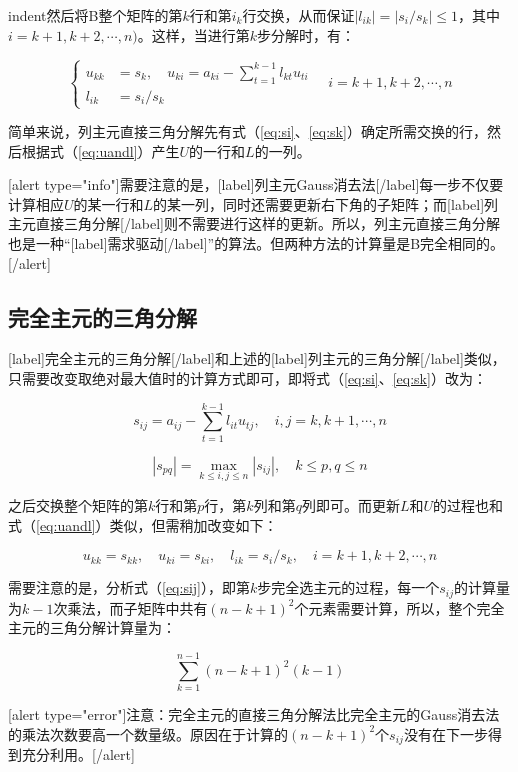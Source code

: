 \documentclass[UTF8,nofonts]{ctexart}
\begin{document}
indent然后将B整个矩阵的第$k$行和第$i_k$行交换，从而保证$|l_{ik}|=|s_i/s_k|\leq 1$，其中$i=k+1,k+2,\cdots,n)$。这样，当进行第$k$步分解时，有：

\begin{equation}
\label{eq:uandl}
\begin{cases}
u_{kk} &= s_{k},\quad u_{ki} = a_{ki}-\sum_{t=1}^{k-1}l_{kt}u_{ti} \\
l_{ik} &= s_i/s_k
\end{cases}
\quad i=k+1,k+2,\cdots,n
\end{equation}

简单来说，列主元直接三角分解先有式（\ref{eq:si}、\ref{eq:sk}）确定所需交换的行，然后根据式（\ref{eq:uandl}）产生$U$的一行和$L$的一列。

[alert type="info"]需要注意的是，[label]列主元Gauss消去法[/label]每一步不仅要计算相应$U$的某一行和$L$的某一列，同时还需要更新右下角的子矩阵；而[label]列主元直接三角分解[/label]则不需要进行这样的更新。所以，列主元直接三角分解也是一种“[label]需求驱动[/label]”的算法。但两种方法的计算量是B完全相同的。[/alert]

\subsection*{完全主元的三角分解}

[label]完全主元的三角分解[/label]和上述的[label]列主元的三角分解[/label]类似，只需要改变取绝对最大值时的计算方式即可，即将式（\ref{eq:si}、\ref{eq:sk}）改为：

\begin{equation}
\label{eq:sij}
s_{ij}=a_{ij}-\sum_{t=1}^{k-1}l_{it}u_{tj},\quad i,j=k,k+1,\cdots,n
\end{equation}

\[
|s_{pq}|=\max_{k\leq i,j \leq n}|s_{ij}|,\quad k\leq p,q \leq n
\]

之后交换整个矩阵的第$k$行和第$p$行，第$k$列和第$q$列即可。而更新$L$和$U$的过程也和式（\ref{eq:uandl}）类似，但需稍加改变如下：

\[
u_{kk}=s_{kk},\quad u_{ki}=s_{ki},\quad l_{ik}=s_i/s_k,\quad i=k+1,k+2,\cdots,n
\]

需要注意的是，分析式（\ref{eq:sij}），即第$k$步完全选主元的过程，每一个$s_{ij}$的计算量为$k-1$次乘法，而子矩阵中共有$(n-k+1)^2$个元素需要计算，所以，整个完全主元的三角分解计算量为：

\[
\sum_{k=1}^{n-1}(n-k+1)^2(k-1)
\]

[alert type="error"]注意：完全主元的直接三角分解法比完全主元的Gauss消去法的乘法次数要高一个数量级。原因在于计算的$(n-k+1)^2$个$s_{ij}$没有在下一步得到充分利用。[/alert]
\end{document}
